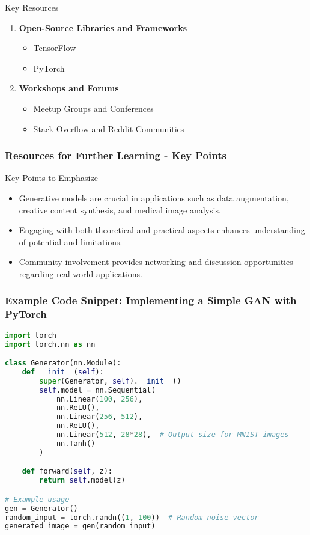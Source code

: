 \documentclass[aspectratio=169]{beamer}
\begin{document}
\begin{frame}
\begin{block}{Key Resources}
\begin{enumerate}
            \item \textbf{Open-Source Libraries and Frameworks}
            \begin{itemize}
                \item TensorFlow
                \item PyTorch
            \end{itemize}
            
            \item \textbf{Workshops and Forums}
            \begin{itemize}
                \item Meetup Groups and Conferences
                \item Stack Overflow and Reddit Communities
            \end{itemize}
        \end{enumerate}
    \end{block}
\end{frame}

\begin{frame}[fragile]
    \frametitle{Resources for Further Learning - Key Points}
    \begin{block}{Key Points to Emphasize}
        \begin{itemize}
            \item Generative models are crucial in applications such as data augmentation, creative content synthesis, and medical image analysis.
            \item Engaging with both theoretical and practical aspects enhances understanding of potential and limitations.
            \item Community involvement provides networking and discussion opportunities regarding real-world applications.
        \end{itemize}
    \end{block}
\end{frame}

\begin{frame}[fragile]
    \frametitle{Example Code Snippet: Implementing a Simple GAN with PyTorch}
    \begin{lstlisting}[language=Python]
import torch
import torch.nn as nn

class Generator(nn.Module):
    def __init__(self):
        super(Generator, self).__init__()
        self.model = nn.Sequential(
            nn.Linear(100, 256),
            nn.ReLU(),
            nn.Linear(256, 512),
            nn.ReLU(),
            nn.Linear(512, 28*28),  # Output size for MNIST images
            nn.Tanh()
        )

    def forward(self, z):
        return self.model(z)

# Example usage
gen = Generator()
random_input = torch.randn((1, 100))  # Random noise vector
generated_image = gen(random_input)
    \end{lstlisting}
\end{frame}
\end{document}
